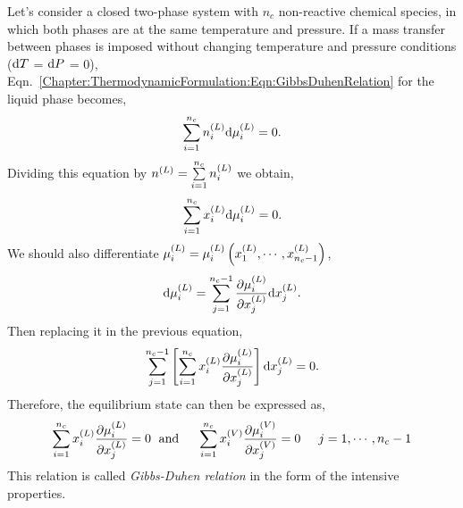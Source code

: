 \bigskip

Let's consider a closed two-phase system with $n_{c}$ non-reactive chemical species, in which both phases are at the same temperature and pressure. If a mass transfer between phases is imposed without changing temperature and pressure conditions (\ie $\d T$ = $\d P$ = 0), Eqn.~\ref{Chapter:ThermodynamicFormulation:Eqn:GibbsDuhenRelation} for the liquid phase becomes,
\begin{displaymath}
   \summation_{i=1}^{n_{c}} \mfr[n]{i}{L}\d\mfr[\mu]{i}{L} = 0.
\end{displaymath}
Dividing this equation by $\mfr[n]{}{L}=\summation_{i=1}^{n_{c}}\mfr[n]{i}{L}$ we obtain,
\begin{displaymath}
   \summation_{i=1}^{n_{c}} \mfr[x]{i}{L}\d\mfr[\mu]{i}{L} = 0.
\end{displaymath}
We should also differentiate $\mfr[\mu]{i}{L} = \mfr[\mu]{i}{L}\left(\mfr[x]{1}{L}, \cdots, \mfr[x]{n_{c}-1}{L}\right)$,
\begin{displaymath}
   \d\mfr[\mu]{i}{L} = \summation_{j=1}^{n_{c}-1} \frc{\partial\mfr[\mu]{i}{L}}{\partial\mfr[x]{j}{L}}\d\mfr[x]{j}{L}.
\end{displaymath}
Then replacing it in the previous equation,
\begin{displaymath}
   \summation_{j=1}^{n_{c}-1}\left[\summation_{i=1}^{n_{c}} \mfr[x]{i}{L}\frc{\partial\mfr[\mu]{i}{L}}{\partial\mfr[x]{j}{L}}\right]\d\mfr[x]{j}{L} = 0.
\end{displaymath}
 Therefore, the equilibrium state can then be expressed as,
\begin{equation}
   \summation_{i=1}^{n_{c}} \mfr[x]{i}{L}\frc{\partial\mfr[\mu]{i}{L}}{\partial\mfr[x]{j}{L}} = 0 \hspace{.1cm}\text{ and }\hspace{.4cm} \summation_{i=1}^{n_{c}} \mfr[x]{i}{V}\frc{\partial\mfr[\mu]{i}{V}}{\partial\mfr[x]{j}{V}} = 0 \hspace{.5cm} j=1, \cdots, n_{c}-1\label{Chapter:ThermodynamicFormulation:Eqn:GibbsDuhenRelation_2}
\end{equation}
This relation is called {\it Gibbs-Duhen relation} in the form of the intensive properties.


